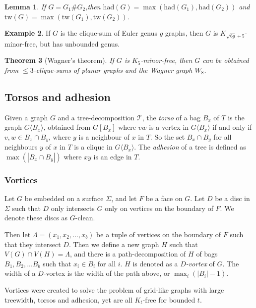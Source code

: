 \documentclass[]{article}
\newcommand{\tree}{\mathcal{T}}
\newcommand{\tw}{\text{tw}}
\newcommand{\had}{\text{had}}
\newtheorem{theorem}{Theorem}
\newtheorem{lemma}[theorem]{Lemma}
\theoremstyle{definition}
\newtheorem{example}[theorem]{Example}
\numberwithin{theorem}{section}
\numberwithin{equation}{section}
\begin{document}
\begin{lemma}
	If $G = G_1 \# G_2$,then $\had(G) = \max(\had(G_1), \had(G_2))$ and $\tw(G) = \max(\tw(G_1), \tw(G_2))$.
\end{lemma}

\begin{example}
	If $G$ is the clique-sum of Euler genus $g$ graphs, then $G$ is $K_{\sqrt{6g} + 5}$-minor-free, but has unbounded genus.
\end{example}

\begin{theorem}[Wagner's theorem]
	If $G$ is $K_5$-minor-free, then $G$ can be obtained from $\leq 3$-clique-sums of planar graphs and the Wagner graph $W_8$.
\end{theorem}


\subsection{Torsos and adhesion}
Given a graph $G$ and a tree-decomposition $\tree$, the \textit{torso} of a bag $B_x$ of $T$ is the graph $G\langle B_x \rangle$, obtained from $G[B_x]$ where $vw$ is a vertex in $G\langle B_x \rangle$ if and only if $v,w \in B_x \cap B_y$, where $y$ is a neighbour of $x$ in $T$. So the set $B_x \cap B_y$ for all neighbours $y$ of $x$ in $T$ is a clique in $G\langle B_x \rangle$. 
The \textit{adhesion} of a tree is defined as $\max(|B_x \cap B_y|)$ where $xy$ is an edge in $T$.

\subsubsection{Vortices}
Let $G$ be embedded on a surface $\Sigma$, and let $F$ be a face on $G$. Let $D$ be a disc in $\Sigma$ such that $D$ only intersects $G$ only on vertices on the boundary of $F$. We denote these discs as $G$-clean. 

Then let $\Lambda = (x_1, x_2, ..., x_b)$ be a tuple of vertices on the boundary of $F$ such that they intersect $D$. Then we define a new graph $H$ such that $V(G) \cap V(H) = \Lambda$, and there is a path-decomposition of $H$ of bags $B_1, B_2, ... B_b$ such that $x_i \in B_i$ for all $i$. $H$ is denoted as a \textit{$D$-vortex} of $G$. The width of a $D$-vortex is the width of the path above, or $\max_i(|B_i| - 1)$. 

Vortices were created to solve the problem of grid-like graphs with large treewidth, torsos and adhesion, yet are all $K_t$-free for bounded $t$. 
\end{document}
